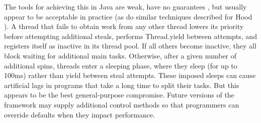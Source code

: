 The tools for achieving this in Java are weak, have no guarantees
\cite{Goetz2006}, but usually appear to be acceptable in practice (as
do similar techniques described for Hood \cite{Blumofe1998}). A thread
that fails to obtain work from any other thread lowers its priority
before attempting additional steals, performs Thread.yield between
attempts, and registers itself as inactive in its thread pool. If all
others become inactive, they all block waiting for additional main
tasks. Otherwise, after a given number of additional spins, threads
enter a sleeping phase, where they sleep (for up to 100ms) rather than
yield between steal attempts. These imposed sleeps can cause
artificial lags in programs that take a long time to split their
tasks. But this appears to be the best general-purpose
compromise. Future versions of the framework may supply additional
control methods so that programmers can override defaults when they
impact performance.

